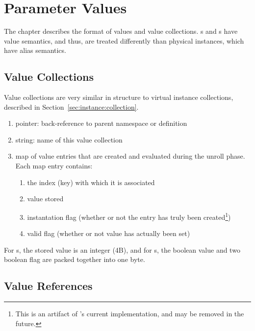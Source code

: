 
\chapter{Parameter Values}
\label{sec:values}

The chapter describes the format of values and value collections.  
\pint s and \pbool s have value semantics, and thus, 
are treated differently than physical instances, which have alias semantics.  

\section{Value Collections}
\label{sec:values:collection}

Value collections are very similar in structure to 
virtual instance collections, 
described in Section~\ref{sec:instance:collection}.

\begin{enumerate}
\item pointer: back-reference to parent namespace or definition
\item string: name of this value collection
\item map of value entries that are created and evaluated
	during the unroll phase.
	Each map entry contains:
	\begin{enumerate}
	\item the index (key) with which it is associated
	\item value stored
	\item instantation flag
		(whether or not the entry has
		truly been created\footnote{This is an artifact of
		\hackt's current implementation, 
		and may be removed in the future.})
	\item valid flag (whether or not value has actually been set)
	\end{enumerate}
\end{enumerate}

For \pint s, the stored value is an integer (4B), 
and for \pbool s, the boolean value and two boolean flag 
are packed together into one byte.  

\section{Value References}
\label{sec:values:reference}


